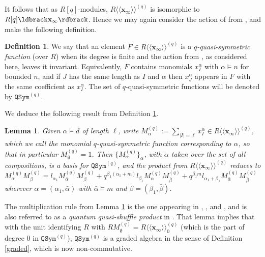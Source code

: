 \documentclass{article}
\newtheorem{lem}[thm]{Lemma}
\theoremstyle{definition}
\newtheorem{defn}[thm]{Definition}
\begin{document}
It follows that as $R[q]$-modules, $R\langle\langle\mathbf{x}_{\infty}\rangle\rangle^{(q)}$ is isomorphic to $R[q]\ldbrack\mathbf{x}_{\infty}\rdbrack$. Hence we may again consider the action of from \cite{[Hi2]}, and make the following definition.
\begin{defn}
We say that an element $F \in R\langle\langle\mathbf{x}_{\infty}\rangle\rangle^{(q)}$ is a \emph{$q$-quasi-symmetric function} (over $R$) when its degree is finite and the action from \cite{[Hi2]}, as considered here, leaves it invariant. Equivalently, $F$ contains monomials $x_{I}^{\alpha}$ with $\alpha \vDash n$ for bounded $n$, and if $J$ has the same length as $I$ and $\alpha$ then $x_{J}^{\alpha}$ appears in $F$ with the same coefficient as $x_{I}^{\alpha}$. The set of $q$-quasi-symmetric functions will be denoted by $\mathtt{QSym}^{(q)}$. \label{QSymqdef}
\end{defn}
We deduce the following result from Definition \ref{QSymqdef}.
\begin{lem}
Given $\alpha \vDash d$ of length $\ell$, write $M_{\alpha}^{(q)}:=\sum_{|I|=\ell}x_{I}^{\alpha} \in R\langle\langle\mathbf{x}_{\infty}\rangle\rangle^{(q)}$, which we call the \emph{monomial $q$-quasi-symmetric function} corresponding to $\alpha$, so that in particular $M_{\emptyset}^{(q)}=1$. Then $\{M_{\alpha}^{(q)}\}_{\alpha}$, with $\alpha$ taken over the set of all compositions, is a basis for $\mathtt{QSym}^{(q)}$, and the product from $R\langle\langle\mathbf{x}_{\infty}\rangle\rangle^{(q)}$ reduces to $M_{\alpha}^{(q)}M_{\beta}^{(q)}=l_{\alpha_{1}}M_{\bar{\alpha}}^{(q)}M_{\beta}^{(q)}+q^{\beta_{1}(\alpha_{1}+m)}l_{\beta_{1}}M_{\alpha}^{(q)}M_{\bar{\beta}}^{(q)}+  q^{\beta_{1}m}l_{\alpha_{1}+\beta_{1}}M_{\bar{\alpha}}^{(q)}M_{\bar{\beta}}^{(q)}$ wherever $\alpha=(\alpha_{1},\bar{\alpha})$ with $\bar{\alpha} \vDash m$ and $\beta=(\beta_{1},\bar{\beta})$. \label{monQSymq}
\end{lem}
The multiplication rule from Lemma \ref{monQSymq} is the one appearing in \cite{[TU]}, \cite{[Ho1]}, and \cite{[L]}, and is also referred to as a \emph{quantum quasi-shuffle product} in \cite{[JRZ]}. That lemma implies that with the unit identifying $R$ with $RM_{\emptyset}^{(q)}=R\langle\langle\mathbf{x}_{\infty}\rangle\rangle^{(q)}_{0}$ (which is the part of degree 0 in $\mathtt{QSym}^{(q)}$), $\mathtt{QSym}^{(q)}$ is a graded algebra in the sense of Definition \ref{graded}, which is now non-commutative.
\end{document}
